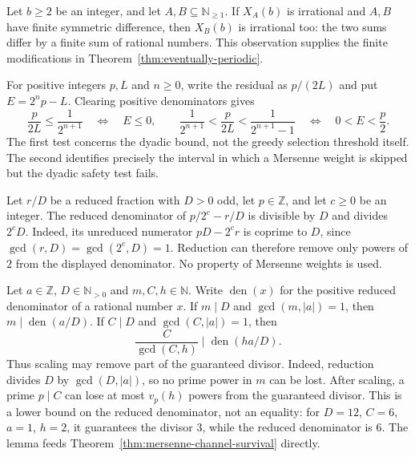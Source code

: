 \begin{lem}
\label{lem:tail-transfer}
Let $b\ge2$ be an integer, and let $A,B\subseteq\mathbb N_{\ge1}$.
If $X_A(b)$ is irrational and $A,B$ have finite symmetric difference, then $X_B(b)$ is irrational too: the two sums differ by a finite sum of
rational numbers.  This observation supplies the finite modifications in
Theorem~\ref{thm:eventually-periodic}.
\end{lem}

\begin{lem}
\label{lem:dyadic-excess-reformulation}
For positive integers $p,L$ and $n\ge0$, write the residual as $p/(2L)$
and put $E=2^np-L$.  Clearing positive denominators gives
\[
 \frac{p}{2L}\le\frac1{2^{n+1}}\quad\Longleftrightarrow\quad E\le0,
 \qquad
 \frac1{2^{n+1}}<\frac{p}{2L}<\frac1{2^{n+1}-1}
 \quad\Longleftrightarrow\quad 0<E<\frac p2.
\]
The first test concerns the dyadic bound, not the greedy selection
threshold itself.  The second identifies precisely the interval in
which a Mersenne weight is skipped but the dyadic safety test fails.
\end{lem}

\begin{lem}
\label{lem:denominator-sandwich}
Let $r/D$ be a reduced fraction with $D>0$ odd, let $p\in\mathbb Z$,
and let $c\ge0$ be an integer.  The reduced denominator of
$p/2^c-r/D$ is divisible by $D$ and divides $2^cD$.
Indeed, its unreduced numerator $pD-2^cr$ is coprime to $D$,
since $\gcd(r,D)=\gcd(2^c,D)=1$.  Reduction can therefore remove
only powers of $2$ from the displayed denominator.  No property
of Mersenne weights is used.
\end{lem}

\begin{lem}
\label{lem:denominator-survival}
Let $a\in\mathbb Z$, $D\in\mathbb N_{>0}$ and $m,C,h\in\mathbb N$.
Write $\operatorname{den}(x)$ for the positive reduced denominator of
a rational number $x$.  If $m\mid D$ and $\gcd(m,|a|)=1$, then
$m\mid\operatorname{den}(a/D)$.  If $C\mid D$ and $\gcd(C,|a|)=1$, then
\[
 \frac{C}{\gcd(C,h)}\mid\operatorname{den}(ha/D).
\]
Thus scaling may remove part of the guaranteed divisor.
Indeed, reduction divides $D$ by $\gcd(D,|a|)$, so no prime power in $m$
can be lost. After scaling, a prime $p\mid C$ can lose at most $v_p(h)$
powers from the guaranteed divisor. This is a lower bound on the reduced
denominator, not an equality: for $D=12$, $C=6$, $a=1$, $h=2$, it guarantees
the divisor $3$, while the reduced denominator is $6$.
The lemma feeds Theorem~\ref{thm:mersenne-channel-survival} directly.
\end{lem}

